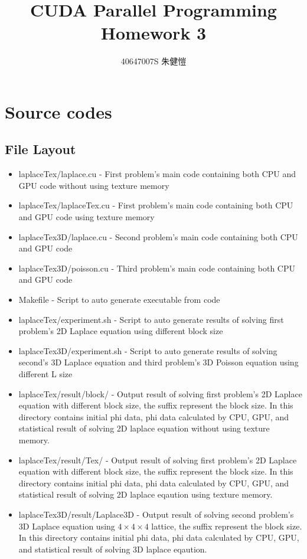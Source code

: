 \documentclass{article}
\title{CUDA Parallel Programming\\Homework 3}
\author{40647007S 朱健愷}
\begin{document}
	\maketitle
	\section{Source codes}
	\subsection{File Layout}
	\begin{itemize}
		\item laplaceTex/laplace.cu - First problem's main code containing both CPU and GPU code without using texture memory
		\item laplaceTex/laplaceTex.cu - First problem's main code containing both CPU and GPU code using texture memory
		\item laplaceTex3D/laplace.cu - Second problem's main code containing both CPU and GPU code
		\item laplaceTex3D/poisson.cu - Third problem's main code containing both CPU and GPU code
		\item Makefile - Script to auto generate executable from code
		\item laplaceTex/experiment.sh - Script to auto generate results of solving first problem's 2D Laplace equation using different block size
		\item laplaceTex3D/experiment.sh - Script to auto generate results of solving second's 3D Laplace equation and third problem's 3D Poisson equation using different L size
		\item laplaceTex/result/block\textunderscore*/ - Output result of solving first problem's 2D Laplace equation with different block size, the suffix represent the block size. In this directory contains initial phi data, phi data calculated by CPU, GPU, and statistical result of solving 2D laplace equation without using texture memory.
		\item laplaceTex/result/Tex\textunderscore*/ - Output result of solving first problem's 2D Laplace equation with different block size, the suffix represent the block size. In this directory contains initial phi data, phi data calculated by CPU, GPU, and statistical result of solving 2D laplace eqaution using texture memory.
		\item laplaceTex3D/result/Laplace\textunderscore3D - Output result of solving second problem's 3D Laplace equation using $4\times4\times4$ lattice, the suffix represent the block size. In this directory contains initial phi data, phi data calculated by CPU, GPU, and statistical result of solving 3D laplace eqaution.

\end{itemize}
\end{document}

